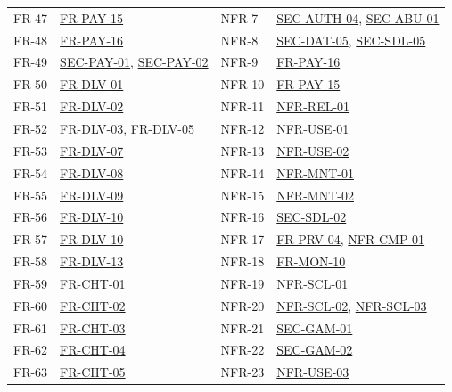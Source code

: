 \documentclass[11pt,a4paper]{report}
\newcommand{\rr}[1]{\hyperlink{#1}{#1}}
\begin{document}
{\begin{longtable}{@{}l >{\raggedright\arraybackslash}p{4.6cm} @{\hspace{1.2cm}} l >{\raggedright\arraybackslash}p{4.6cm}@{}}
FR-47 & \rr{FR-PAY-15} & NFR-7 & \rr{SEC-AUTH-04}, \rr{SEC-ABU-01} \\
FR-48 & \rr{FR-PAY-16} & NFR-8 & \rr{SEC-DAT-05}, \rr{SEC-SDL-05} \\
FR-49 & \rr{SEC-PAY-01}, \rr{SEC-PAY-02} & NFR-9 & \rr{FR-PAY-16} \\
FR-50 & \rr{FR-DLV-01} & NFR-10 & \rr{FR-PAY-15} \\
FR-51 & \rr{FR-DLV-02} & NFR-11 & \rr{NFR-REL-01} \\
FR-52 & \rr{FR-DLV-03}, \rr{FR-DLV-05} & NFR-12 & \rr{NFR-USE-01} \\
FR-53 & \rr{FR-DLV-07} & NFR-13 & \rr{NFR-USE-02} \\
FR-54 & \rr{FR-DLV-08} & NFR-14 & \rr{NFR-MNT-01} \\
FR-55 & \rr{FR-DLV-09} & NFR-15 & \rr{NFR-MNT-02} \\
FR-56 & \rr{FR-DLV-10} & NFR-16 & \rr{SEC-SDL-02} \\
FR-57 & \rr{FR-DLV-10} & NFR-17 & \rr{FR-PRV-04}, \rr{NFR-CMP-01} \\
FR-58 & \rr{FR-DLV-13} & NFR-18 & \rr{FR-MON-10} \\
FR-59 & \rr{FR-CHT-01} & NFR-19 & \rr{NFR-SCL-01} \\
FR-60 & \rr{FR-CHT-02} & NFR-20 & \rr{NFR-SCL-02}, \rr{NFR-SCL-03} \\
FR-61 & \rr{FR-CHT-03} & NFR-21 & \rr{SEC-GAM-01} \\
FR-62 & \rr{FR-CHT-04} & NFR-22 & \rr{SEC-GAM-02} \\
FR-63 & \rr{FR-CHT-05} & NFR-23 & \rr{NFR-USE-03} \\
\end{longtable}}
\end{document}

